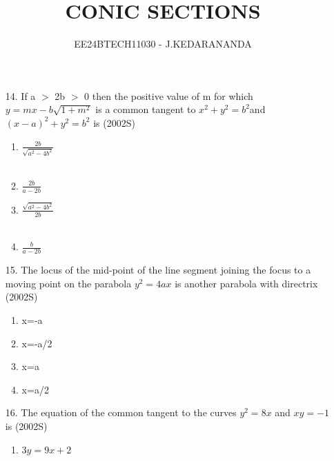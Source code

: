 \documentclass[journal,12pt,twocolumn]{IEEEtran}
\theoremstyle{remark}
\begin{document}

\vspace{3cm}

\title{CONIC SECTIONS}
\author{EE24BTECH11030 - J.KEDARANANDA}
\maketitle
\newpage
\bigskip

\renewcommand{\thefigure}{\theenumi}
\renewcommand{\thetable}{\theenumi}

\begin{enumerate}
\item[14.] If a $>$ 2b $>$ 0 then the positive value of m for which       $y=mx-b\sqrt{1+m^{2}} $ is a common tangent to $x^{2} + y^{2} = b^{2} $and  $(x-a)^{2} + y^{2} = b^{2}$ is   \hfill {(2002S)}
\begin{multicols}{2}
\begin{enumerate}
    \item $\frac{2b}{\sqrt{a^{2}-4b^{2}}}$\\\\
    \item $\frac{2b}{a-2b}$
    \item $\frac{\sqrt{a^{2}-4b^{2}}}{2b}$\\\\
    \item $\frac{b}{a-2b}$
\end{enumerate} 
\end{multicols}
\item[15.] The locus of the mid-point of the line segment joining the focus to a moving point on the parabola $y^{2} = 4ax$ is another parabola with directrix \hfill{(2002S)}
\begin{multicols}{4}
 \begin{enumerate}
    \item x=-a
    \item x=-a/2
    \item x=a
    \item x=a/2
 \end{enumerate}
\end{multicols}
\item[16.] The equation of the common tangent to the curves $y^{2}=8x$ and $xy=-1$ is \hfill{(2002S)}
\begin{multicols}{2}
\begin{enumerate}
    \item $3y=9x+2$\\\\

\end{enumerate}
\end{multicols}
\end{enumerate}
\end{document}
